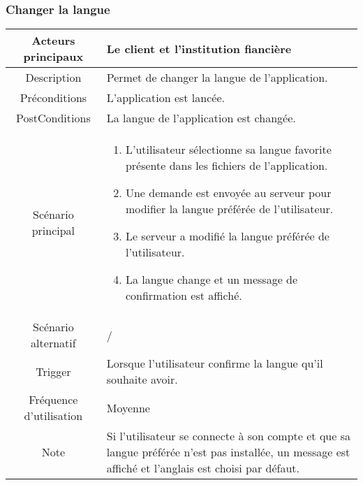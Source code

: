 \documentclass{article}
\begin{document}
\newpage

\subsubsection{Changer la langue}

\begin{table}[h]
   \begin{tabular}{|c|p{10cm}|}
      \hline
      Acteurs principaux&Le client et l'institution fiancière \\
      \hline
      Description&Permet de changer la langue de l'application.\\
      \hline
      Préconditions&L'application est lancée.\\
      \hline
      PostConditions&La langue de l'application est changée.\\
      \hline
      Scénario principal& 
            \begin{enumerate}
               \item L'utilisateur sélectionne sa langue favorite présente dans les fichiers de l'application.
               \item Une demande est envoyée au serveur pour modifier la langue préférée de l'utilisateur.
               \item Le serveur a modifié la langue préférée de l'utilisateur.
               \item La langue change et un message de confirmation est affiché.
            \end{enumerate}     \\
      \hline
      Scénario alternatif& / \\
      \hline
      Trigger&Lorsque l'utilisateur confirme la langue qu'il souhaite avoir.\\
      \hline
      Fréquence d'utilisation&Moyenne\\
      \hline
      Note&Si l'utilisateur se connecte à son compte et que sa langue préférée n'est pas installée, 
      un message est affiché et l'anglais est choisi par défaut.\\
      \hline
   \end{tabular}
\end{table}

\newpage
\end{document}

